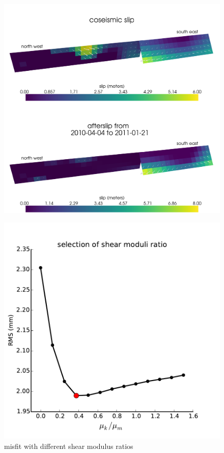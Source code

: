 \documentclass[12pt]{article}
\begin{document}
\begin{figure}
\includegraphics[scale=0.09]{Figures/elasticslip}
\caption{}
\label{fig:InitialSlip}
\end{figure} 


\begin{figure}
\includegraphics[scale=1.0]{Figures/shear_ratio}
\centering 
\caption{misfit with different shear modulus ratios}
\label{fig:ShearModulusRatio}
\end{figure} 
\end{document}
